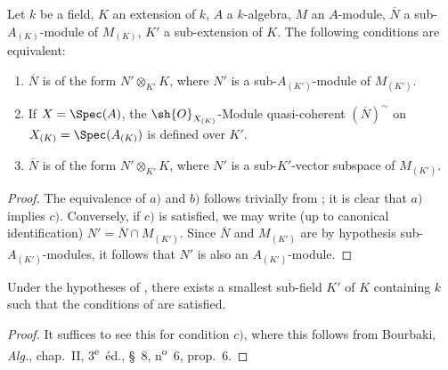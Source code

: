 \begin{lemma}[4.8.6]
\label{IV.4.8.6}
Let $k$ be a field, $K$ an extension of $k$, $A$ a $k$-algebra, $M$ an $A$-module, $\overline{N}$ a sub-$A_{(K)}$-module of $M_{(K)}$, $K'$ a sub-extension of $K$.
The following conditions are equivalent:
\begin{enumerate}[label=\emph{\alph*)}]
  \item $\overline{N}$ is of the form $N'\otimes_{K'} K$, where $N'$ is a sub-$A_{(K')}$-module of $M_{(K')}$.
  \item If $X=\Spec(A)$, the $\sh{O}_{X_{(K)}}$-Module quasi-coherent $(\overline{N})^\sim$ on $X_{(K)}=\Spec(A_{(K)})$ is defined over $K'$.
  \item $\overline{N}$ is of the form $N'\otimes_{K'} K$, where $N'$ is a sub-$K'$-vector subspace of $M_{(K')}$.
\end{enumerate}
\end{lemma}

\begin{proof}
The equivalence of $a)$ and $b)$ follows trivially from ; it is clear that $a)$ implies $c)$.
Conversely, if $c)$ is satisfied, we may write (up to canonical identification) $N'=\overline{N}\cap M_{(K')}$.
Since $\overline{N}$ and $M_{(K')}$ are by hypothesis sub-$A_{(K')}$-modules, it follows that $N'$ is also an $A_{(K')}$-module.
\end{proof}

\begin{corollary}[4.8.7]
\label{IV.4.8.7}
Under the hypotheses of , there exists a smallest sub-field $K'$ of $K$ containing $k$ such that the conditions of  are satisfied.
\end{corollary}

\begin{proof}
It suffices to see this for condition $c)$, where this follows from Bourbaki, \emph{Alg.}, chap.~II, 3\textsuperscript{e}~\'{e}d., \S~8, n\textsuperscript{o}~6, prop.~6.
\end{proof}

